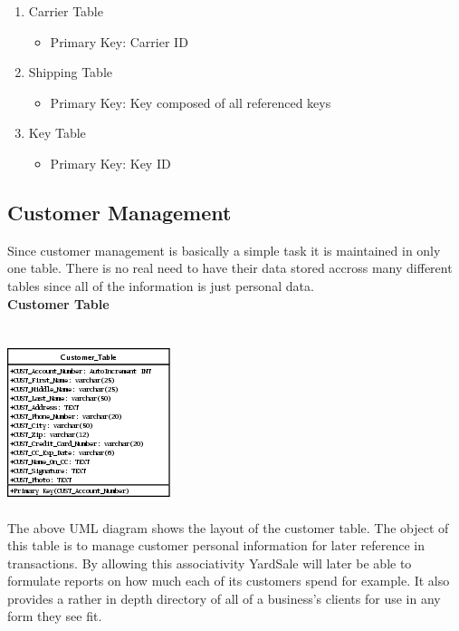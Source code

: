 \documentclass{report}
\begin{document}
\begin{enumerate}
        \item{Carrier Table}
        \begin{itemize}
            \item{Primary Key: Carrier ID}
        \end{itemize}
        \item{Shipping Table}
        \begin{itemize}
            \item{Primary Key: Key composed of all referenced keys}
        \end{itemize}
        \item{Key Table}
        \begin{itemize}
            \item{Primary Key: Key ID}
        \end{itemize}
    \end{enumerate}

    \newpage

        \subsection{Customer Management}

        Since customer management is basically a simple task it is maintained in only
        one table. There is no real need to have their data stored accross many
        different tables since all of the information is just personal
        data.\\

        {\bf Customer Table}\\
        \\
        \\
        \includegraphics{Tables/CustomerTable.png}\\
        \\
        The above UML diagram shows the layout of the customer table. The object of this
        table is to manage customer personal information for later reference in
        transactions. By allowing this associativity YardSale will later be able to
        formulate reports on how much each of its customers spend for example. It also
        provides a rather in depth directory of all of a business's clients for use
        in any form they see fit.
\end{document}
